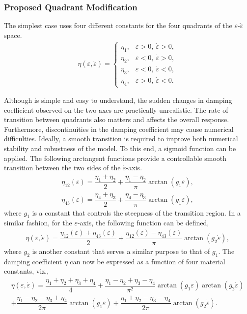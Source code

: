 \subsubsection{Proposed Quadrant Modification}\label{sec:quadrant_damper}
The simplest case uses four different constants for the four quadrants of the $\varepsilon$-$\dot{\varepsilon}$ space.
\begin{gather}\label{eq:quadrant_damper}
\eta\left(\varepsilon,\dot\varepsilon\right)=\left\{\begin{array}{lc}
\eta_1,&\varepsilon>0,~\dot{\varepsilon}>0,\\
\eta_2,&\varepsilon<0,~\dot{\varepsilon}>0,\\
\eta_3,&\varepsilon<0,~\dot{\varepsilon}<0,\\
\eta_4,&\varepsilon>0,~\dot{\varepsilon}<0.
\end{array}\right.
\end{gather}

Although  is simple and easy to understand, the sudden changes in damping coefficient observed on the two axes are practically unrealistic.
The rate of transition between quadrants also matters and affects the overall response.
Furthermore, discontinuities in the damping coefficient may cause numerical difficulties.
Ideally, a smooth transition is required to improve both numerical stability and robustness of the model.
To this end, a sigmoid function can be applied.
The following arctangent functions provide a controllable smooth transition between the two sides of the $\dot{\varepsilon}$-axis.
\begin{gather}
\eta_{12}\left(\varepsilon\right)=\dfrac{\eta_1+\eta_2}{2}+\dfrac{\eta_1-\eta_2}{\pi}\arctan\left(g_1\varepsilon\right),\\
\eta_{43}\left(\varepsilon\right)=\dfrac{\eta_4+\eta_3}{2}+\dfrac{\eta_4-\eta_3}{\pi}\arctan\left(g_1\varepsilon\right),
\end{gather}
where $g_1$ is a constant that controls the steepness of the transition region.
In a similar fashion, for the $\varepsilon$-axis, the following function can be defined,
\begin{gather}
\eta\left(\varepsilon,\dot\varepsilon\right)=\dfrac{\eta_{12}\left(\varepsilon\right)+\eta_{43}\left(\varepsilon\right)}{2}+\dfrac{\eta_{12}\left(\varepsilon\right)-\eta_{43}\left(\varepsilon\right)}{\pi}\arctan\left(g_2\dot\varepsilon\right),
\end{gather}
where $g_2$ is another constant that serves a similar purpose to that of $g_1$.
The damping coefficient $\eta$ can now be expressed as a function of four material constants, viz.,
\begin{multline}\label{eq:arctan_transition}
\eta\left(\varepsilon,\dot\varepsilon\right)=\dfrac{\eta_1+\eta_2+\eta_3+\eta_4}{4}+\dfrac{\eta_1-\eta_2+\eta_3-\eta_4}{\pi^2}\arctan\left(g_1\varepsilon\right)\arctan\left(g_2\dot\varepsilon\right)\\+\dfrac{\eta_1-\eta_2-\eta_3+\eta_4}{2\pi}\arctan\left(g_1\varepsilon\right)+\dfrac{\eta_1+\eta_2-\eta_3-\eta_4}{2\pi}\arctan\left(g_2\dot\varepsilon\right).
\end{multline}

